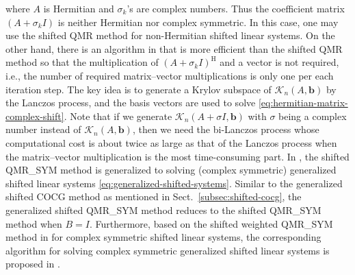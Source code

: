 {where $A$ is Hermitian and $\sigma_k$'s are complex numbers. Thus the coefficient matrix $(A+\sigma_k I)$ is neither Hermitian nor complex symmetric. In this case, one may use the shifted QMR method for non-Hermitian shifted linear systems. On the other hand, there is an algorithm in  that is more efficient than the shifted QMR method so that the multiplication of $(A+\sigma_k I)^{\mathrm H}$ and a vector is not required, i.e., the number of required matrix--vector multiplications is only one per each iteration step. The key idea is to generate a Krylov subspace of $\mathcal K_n(A,\bm b)$ by the Lanczos process, and the basis vectors are used to solve \eqref{eq:hermitian-matrix-complex-shift}. Note that if we generate $\mathcal K_n(A+\sigma I,\bm b)$ with $\sigma$ being a complex number instead of $\mathcal K_n(A,\bm b)$, then we need the bi-Lanczos process whose computational cost is about twice as large as that of the Lanczos process when the matrix--vector multiplication is the most time-consuming part.}
{In , the shifted QMR\_SYM method is generalized to solving (complex symmetric) generalized shifted linear systems \eqref{eq:generalized-shifted-systems}. Similar to the generalized shifted COCG method as mentioned in Sect.\ \ref{subsec:shifted-cocg}, the generalized shifted QMR\_SYM method  reduces to the shifted QMR\_SYM method when $B=I$. Furthermore, based on the shifted weighted QMR\_SYM method in  for complex symmetric shifted linear systems, the corresponding algorithm for solving complex symmetric generalized shifted linear systems is proposed in .}
